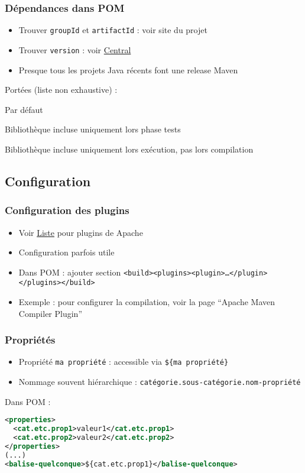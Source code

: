 \documentclass[english, french]{beamer}
\begin{document}
\begin{frame}
	\frametitle{Dépendances dans POM}
	\begin{itemize}
		\item Trouver \texttt{groupId} et \texttt{artifactId} : voir site du projet
		\item Trouver \texttt{version} : voir \href{https://search.maven.org}{Central}
		\item Presque tous les projets Java récents font une release Maven
	\end{itemize}
	Portées (liste non exhaustive) :
	\begin{description}
		\item[\texttt{compile}] Par défaut
		\item[\texttt{test}] Bibliothèque incluse uniquement lors phase tests
		\item[\texttt{runtime}] Bibliothèque incluse uniquement lors exécution, pas lors compilation
	\end{description}
\end{frame}

\subsection{Configuration}
\begin{frame}
	\frametitle{Configuration des plugins}
	\begin{itemize}
		\item Voir \href{https://maven.apache.org/plugins/index.html}{Liste} pour plugins de Apache
		\item Configuration parfois utile
		\item Dans POM : ajouter section \texttt{<build><plugins><plugin>…</plugin></plugins></build>}
		\item Exemple : pour configurer la compilation, voir la page “Apache Maven Compiler Plugin”
	\end{itemize}
\end{frame}

\begin{frame}[fragile]
	\frametitle{Propriétés}
	\begin{itemize}
		\item Propriété \texttt{ma propriété} : accessible via \texttt{\$\{ma propriété\}}
		\item Nommage souvent hiérarchique : \texttt{catégorie.sous-catégorie.nom-propriété}
	\end{itemize}
	Dans POM : 
	\begin{lstlisting}[keywordstyle=\fontspec{Latin Modern Mono Light}\textbf, emph={project, modelVersion, groupId, artifactId, version}, emphstyle=\fontspec{Latin Modern Mono Light}\textbf, language=XML, basicstyle=\small\NoAutoSpacing\ttfamily, aboveskip=0pt, belowskip=0pt, showstringspaces=false]
<properties>
  <cat.etc.prop1>valeur1</cat.etc.prop1>
  <cat.etc.prop2>valeur2</cat.etc.prop2>
</properties>
(...)
<balise-quelconque>${cat.etc.prop1}</balise-quelconque>
		\end{lstlisting}
\end{frame}
\end{document}
